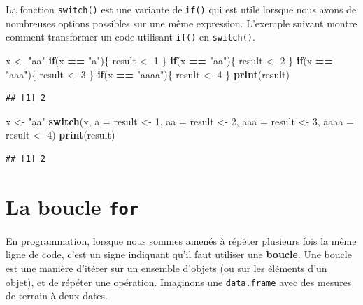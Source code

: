 \documentclass[
]{book}
\newenvironment{Shaded}{\begin{snugshade}}{\end{snugshade}}
\newcommand{\ControlFlowTok}[1]{\textcolor[rgb]{0.13,0.29,0.53}{\textbf{#1}}}
\newcommand{\DataTypeTok}[1]{\textcolor[rgb]{0.13,0.29,0.53}{#1}}
\newcommand{\DecValTok}[1]{\textcolor[rgb]{0.00,0.00,0.81}{#1}}
\newcommand{\KeywordTok}[1]{\textcolor[rgb]{0.13,0.29,0.53}{\textbf{#1}}}
\newcommand{\NormalTok}[1]{#1}
\newcommand{\OperatorTok}[1]{\textcolor[rgb]{0.81,0.36,0.00}{\textbf{#1}}}
\newcommand{\StringTok}[1]{\textcolor[rgb]{0.31,0.60,0.02}{#1}}
\begin{document}
La fonction \texttt{switch()} est une variante de \texttt{if()} qui est utile lorsque nous avons de nombreuses options possibles sur une même expression. L'exemple suivant montre comment transformer un code utilisant \texttt{if()} en \texttt{switch()}.

\begin{Shaded}
\begin{Highlighting}[]
\NormalTok{x <-}\StringTok{ "aa"}
\ControlFlowTok{if}\NormalTok{(x }\OperatorTok{==}\StringTok{ "a"}\NormalTok{)\{}
\NormalTok{  result <-}\StringTok{ }\DecValTok{1}
\NormalTok{\}}
\ControlFlowTok{if}\NormalTok{(x }\OperatorTok{==}\StringTok{ "aa"}\NormalTok{)\{}
\NormalTok{  result <-}\StringTok{ }\DecValTok{2}
\NormalTok{\}}
\ControlFlowTok{if}\NormalTok{(x }\OperatorTok{==}\StringTok{ "aaa"}\NormalTok{)\{}
\NormalTok{  result <-}\StringTok{ }\DecValTok{3}
\NormalTok{\}}
\ControlFlowTok{if}\NormalTok{(x }\OperatorTok{==}\StringTok{ "aaaa"}\NormalTok{)\{}
\NormalTok{  result <-}\StringTok{ }\DecValTok{4}
\NormalTok{\}}
\KeywordTok{print}\NormalTok{(result)}
\end{Highlighting}
\end{Shaded}

\begin{verbatim}
## [1] 2
\end{verbatim}

\begin{Shaded}
\begin{Highlighting}[]
\NormalTok{x <-}\StringTok{ "aa"}
\ControlFlowTok{switch}\NormalTok{(x, }
  \DataTypeTok{a =}\NormalTok{ result <-}\StringTok{ }\DecValTok{1}\NormalTok{,}
  \DataTypeTok{aa =}\NormalTok{ result <-}\StringTok{ }\DecValTok{2}\NormalTok{,}
  \DataTypeTok{aaa =}\NormalTok{ result <-}\StringTok{ }\DecValTok{3}\NormalTok{,}
  \DataTypeTok{aaaa =}\NormalTok{ result <-}\StringTok{ }\DecValTok{4}\NormalTok{)}
\KeywordTok{print}\NormalTok{(result)}
\end{Highlighting}
\end{Shaded}

\begin{verbatim}
## [1] 2
\end{verbatim}

\hypertarget{l17for}{%
\section{\texorpdfstring{La boucle \texttt{for}}{La boucle for}}\label{l17for}}

En programmation, lorsque nous sommes amenés à répéter plusieurs fois la même ligne de code, c'est un signe indiquant qu'il faut utiliser une \textbf{boucle}. Une boucle est une manière d'itérer sur un ensemble d'objets (ou sur les éléments d'un objet), et de répéter une opération. Imaginons une \texttt{data.frame} avec des mesures de terrain à deux dates.
\end{document}
